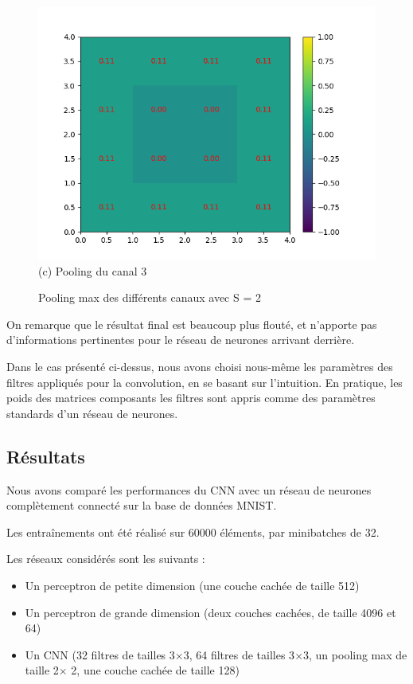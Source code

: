 \begin{figure}[!h]
        \includegraphics[width=\textwidth]{img/cnn_exemple/square/stride_3_max.png}
        \center 
        (c) Pooling du canal 3
    \endminipage
    \caption{Pooling max des différents canaux avec S = 2} 
\end{figure}

On remarque que le résultat final est beaucoup plus flouté, et n'apporte pas d'informations pertinentes pour le réseau de 
neurones arrivant derrière.

Dans le cas présenté ci-dessus, nous avons choisi nous-même les paramètres des filtres appliqués pour la convolution,
en se basant sur l'intuition.
En pratique, les poids des matrices composants les filtres sont appris comme des paramètres standards d'un réseau de neurones.

\subsection{Résultats}

Nous avons comparé les performances du CNN avec un réseau de neurones complètement connecté sur la base de données MNIST.

Les entraînements ont été réalisé sur 60000 éléments, par minibatches de 32.

Les réseaux considérés sont les suivants : 
\begin{itemize}
    \item Un perceptron de petite dimension (une couche cachée de taille 512)
    \item Un perceptron de grande dimension (deux couches cachées, de taille 4096 et 64)
    \item Un CNN (32 filtres de tailles 3$\times$3, 64 filtres de tailles 3$\times$3, un pooling max de taille 2$\times$ 2, une couche cachée de taille 128)
\end{itemize}

